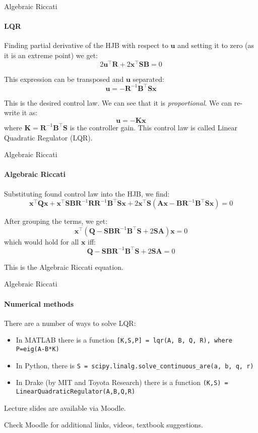 \documentclass{beamer}
\begin{document}
\begin{frame}{Algebraic Riccati}
\framesubtitle{LQR}
\begin{flushleft}


Finding partial derivative of the HJB with respect to $\mathbf u$ and setting it to zero (as it is an extreme point) we get:
\[
2 \mathbf  u^\top \mathbf R + 
2 \mathbf x^\top \mathbf S \mathbf B = 0
\]

This expression can be transposed and $\mathbf  u$ separated:
\[
\mathbf  u = 
-\mathbf R^{-1} \mathbf B^\top \mathbf S \mathbf x
\]

This is the desired control law. We can see that it is \emph{proportional}. We can re-write it as:
\[
\mathbf  u = -\mathbf K \mathbf x
\]
where $\mathbf K = \mathbf R^{-1} \mathbf B^\top \mathbf S$ is the controller gain. This control law is called Linear Quadratic Regulator (LQR).

\end{flushleft}
\end{frame}


\begin{frame}{Algebraic Riccati}
\framesubtitle{Algebraic Riccati}
\begin{flushleft}

Substituting found control law into the HJB, we find:
\[
\mathbf  x^\top \mathbf Q \mathbf x +
\mathbf x^\top \mathbf S \mathbf B \mathbf R^{-1} \mathbf R \mathbf  R^{-1} \mathbf B^\top \mathbf S \mathbf x + 
2\mathbf x^\top \mathbf S
(\mathbf A  \mathbf x - \mathbf B \mathbf R^{-1} \mathbf B^\top \mathbf S \mathbf x) = 0
\]

After grouping the terms, we get:
%
\[
\mathbf  x^\top (\mathbf Q - \mathbf S \mathbf B \mathbf  R^{-1} \mathbf B^\top \mathbf S + 
2 \mathbf S \mathbf A) \mathbf x = 0
\]
%
which would hold for all $\mathbf x$ iff:
%
\[
\mathbf Q - \mathbf S \mathbf B \mathbf  R^{-1} \mathbf B^\top \mathbf S + 2 \mathbf S \mathbf A = 0
\]

This is the Algebraic Riccati equation.

\end{flushleft}
\end{frame}

\begin{frame}{Algebraic Riccati}
\framesubtitle{Numerical methods}
\begin{flushleft}

There are a number of ways to solve LQR:
\begin{itemize}
    \item In MATLAB there is a function \texttt{[K,S,P] = lqr(A, B, Q, R), where P=eig(A-B*K)}
    \item In Python, there is \texttt{S = scipy.linalg.solve\_continuous\_are(a, b, q, r)}
    \item In Drake (by MIT and Toyota Research) there is a function \texttt{(K,S) = LinearQuadraticRegulator(A,B,Q,R)}
\end{itemize}

\end{flushleft}
\end{frame}



\begin{frame}
\centerline{Lecture slides are available via Moodle.}
\bigskip
\centerline{Check Moodle for additional links, videos, textbook suggestions.}
\end{frame}
\end{document}
